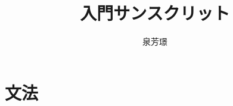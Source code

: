 \documentclass[12pt]{ltjsbook}
\title{入門サンスクリット}
\author{泉芳璟}
\begin{document}
\maketitle

\tableofcontents




\part{文法}



\end{document}

